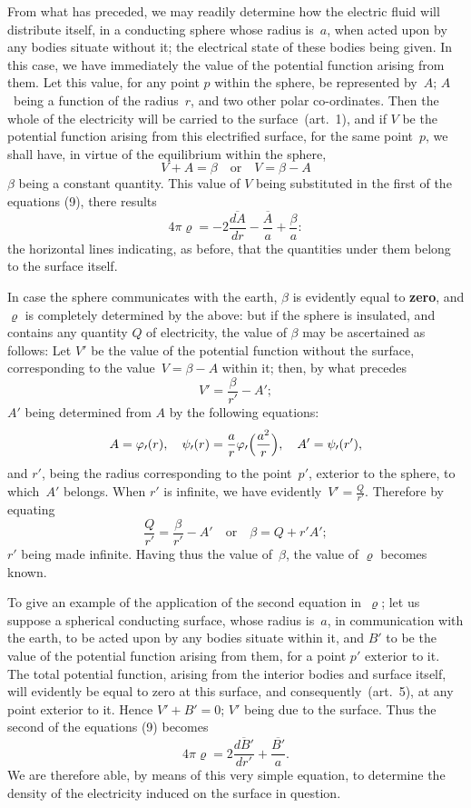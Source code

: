 \documentclass[11pt,notitlepage]{amsart}
\let\Emphasis\textbf
\renewcommand{\rho}{\varrho}
\renewcommand{\phi}{\varphi}
\begin{document}
From what has preceded, we may readily determine how the electric
fluid will distribute itself, in a conducting sphere whose radius is~$a$, when
acted upon by any bodies situate without it;
the electrical state of these bodies
being given. In this case, we have immediately the value of the potential
function arising from them. Let this value, for any point $p$ within the sphere,
be represented by~$A$; $A$~being a function of the radius~$r$, and two other
polar co-ordinates. Then the whole of the electricity will be carried to the
surface~(art.~1), and if $V$ be the potential function
arising from this electrified
surface, for the same point~$p$, we shall have,
in virtue of the equilibrium
within the sphere,
\[
V+A=\beta
\quad\text{or}\quad
V=\beta-A
\]
$\beta$ being a constant quantity.
This value of $V$ being substituted in the first
of the equations (9), there results
\[
4\pi\rho=-2\frac{\overline{dA}}{dr}-\frac{\overline{A}}{a}+\frac{\beta}{a}:
\]
the horizontal lines indicating, as before,
that the quantities under them belong
to the surface itself.

In case the sphere communicates with the earth, $\beta$ is evidently equal
to \Emphasis{zero}, and $\rho$ is completely determined by the above:
but if the sphere is
insulated, and contains any quantity $Q$ of electricity,
the value of $\beta$ may be
ascertained as follows: Let $V'$ be the value
of the potential function without
the surface, corresponding to the value~${V=\beta-A}$ within it;
then, by what precedes
\[
V'=\frac{\beta}{r'}-A';
\]
$A'$ being determined from $A$ by the following equations:
\[
A=\phi_\prime(r),\quad
\psi_\prime(r)=\frac{a}{r}\phi_\prime\Bigl(\frac{a^2}{r}\Bigr),\quad
A'=\psi_\prime(r'),
\]
and $r'$, being the radius corresponding to the point~$p'$,
exterior to the sphere,
to which~$A'$ belongs. When $r'$ is infinite,
we have evidently~${V'=\frac{Q}{r'}}$.
Therefore by equating
\[
\frac{Q}{r'}=\frac{\beta}{r'}-A'
\quad\text{or}\quad
\beta=Q+r'A';
\]
$r'$ being made infinite. Having thus the value of~$\beta$,
the value of $\rho$ becomes known.

To give an example of the application of the second equation in~$\rho$;
let us suppose a spherical conducting surface, whose radius is~$a$, in 
communication with the earth,
to be acted upon by any bodies situate within it, and
$B'$ to be the value of the potential function arising from them,
for a point $p'$
exterior to it. The total potential function, arising from the interior bodies
and surface itself, will evidently be equal to zero at this surface, and 
consequently~(art.~5), at any point exterior to it.
Hence $V'+B'=0$; $V'$ being
due to the surface. Thus the second of the equations (9) becomes
\[
4\pi\rho=2\frac{\overline{dB'}}{dr'}+\frac{\overline{B'}}{a}.
\]
We are therefore able, by means of this very simple equation, to determine
the density of the electricity induced on the surface in question.
\end{document}
